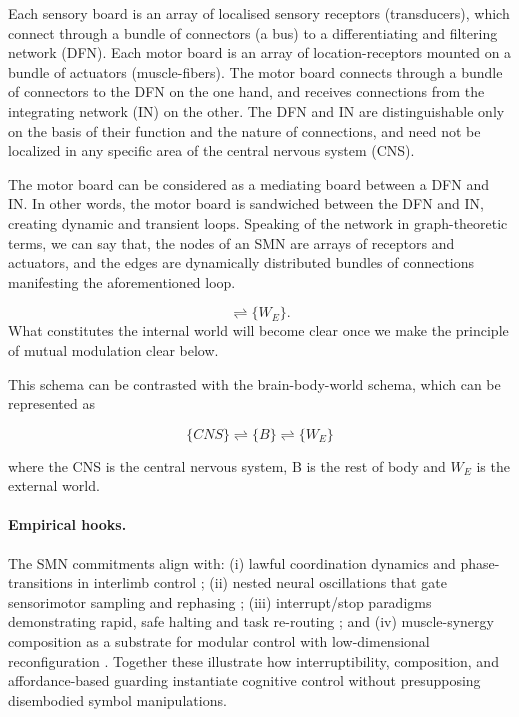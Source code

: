 Each sensory board is an array of localised sensory receptors (transducers), which connect through a bundle of connectors (a bus) to a differentiating and filtering network (DFN). Each motor board is an array of location-receptors mounted on a bundle of actuators (muscle-fibers). The motor board connects through a bundle of connectors to the DFN on the one hand, and receives connections from the integrating network (IN) on the other. The DFN and IN are distinguishable only on the basis of their function and the nature of connections, and need not be localized in any specific area of the central nervous system (CNS).

The motor board can be considered as a mediating board between a DFN and IN. In other words, the motor board is sandwiched between the DFN and IN, creating dynamic and transient loops. Speaking of the network in graph-theoretic terms, we can say that, the nodes of an SMN are arrays of receptors and actuators, and the edges are dynamically distributed bundles of connections manifesting the aforementioned loop.

\begin{equation}
[\{n(SMN)\}_i \rightleftharpoons \{n(SMN)\}_j] \rightleftharpoons \{W_E\}.
\end{equation}
What constitutes the internal world will become clear once we make the principle of mutual modulation clear below.


This schema can be contrasted with the brain-body-world schema, which can be represented as 

\begin{equation}
\{CNS\} \rightleftharpoons \{B\} \rightleftharpoons \{W_E\}
\end{equation}

where the CNS is the central nervous system, B is the rest of body and $W_E$ is the external world.

\paragraph{Empirical hooks.}
The SMN commitments align with: (i) lawful coordination dynamics and phase-transitions in interlimb control \citep{HakenKelsoBunz1985,Kelso1995}; 
(ii) nested neural oscillations that gate sensorimotor sampling and rephasing \citep{Buzsaki2006}; 
(iii) interrupt/stop paradigms demonstrating rapid, safe halting and task re-routing \citep{Aron2007}; and 
(iv) muscle-synergy composition as a substrate for modular control with low-dimensional reconfiguration \citep{BizziCheung2013}. 
Together these illustrate how interruptibility, composition, and affordance-based guarding instantiate cognitive control without presupposing disembodied symbol manipulations.

